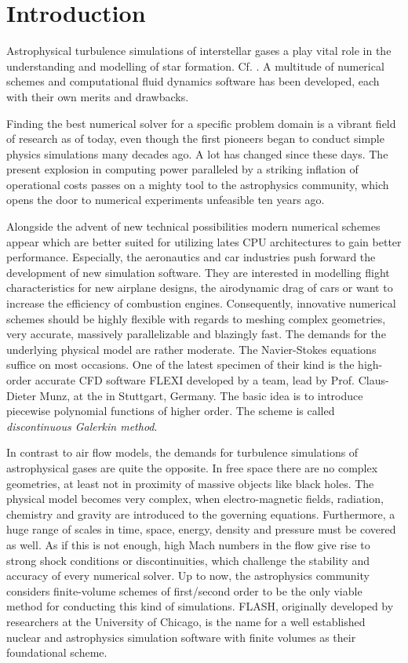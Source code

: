 \section{Introduction}

Astrophysical turbulence simulations of interstellar gases a play vital role in
the understanding and modelling of star formation. Cf.
\cite{mac2004turbulence}. A multitude of numerical schemes and computational
fluid dynamics software has been developed, each with their own merits and
drawbacks.

Finding the best numerical solver for a specific problem domain is a vibrant
field of research as of today, even though the first pioneers began to conduct
simple physics simulations many decades ago. A lot has changed since these
days. The present explosion in computing power paralleled by a striking
inflation of operational costs passes on a mighty tool to the astrophysics
community, which opens the door to numerical experiments unfeasible ten years
ago.

Alongside the advent of new technical possibilities modern numerical schemes
appear which are better suited for utilizing lates CPU architectures to gain
better performance. Especially, the aeronautics and car industries push forward
the development of new simulation software. They are interested in modelling
flight characteristics for new airplane designs, the airodynamic drag of cars
or want to increase the efficiency of combustion engines. Consequently,
innovative numerical schemes should be highly flexible with regards to meshing
complex geometries, very accurate, massively parallelizable and blazingly fast.
The demands for the underlying physical model are rather moderate. The
Navier-Stokes equations suffice on most occasions. One of the latest specimen
of their kind is the high-order accurate CFD software FLEXI developed by a
team, lead by Prof. Claus-Dieter Munz, at the  in Stuttgart, Germany.  The basic idea is to introduce
piecewise polynomial functions of higher order. The scheme is called
\emph{discontinuous Galerkin method}.

In contrast to air flow models, the demands for turbulence simulations of
astrophysical gases are quite the opposite. In free space there are no complex
geometries, at least not in proximity of massive objects like black holes. The
physical model becomes very complex, when electro-magnetic fields,
radiation, chemistry and gravity are introduced to the governing equations.
Furthermore, a huge range of scales in time, space, energy, density and pressure
must be covered as well. As if this is not enough, high Mach numbers in the flow
give rise to strong shock conditions or discontinuities, which challenge the
stability and accuracy of every numerical solver. Up to now, the astrophysics
community considers finite-volume schemes of first/second order to be the only
viable method for conducting this kind of simulations. FLASH, originally developed by
researchers at the University of Chicago, is the name for a well established
nuclear and astrophysics simulation software with finite volumes as their
foundational scheme.

